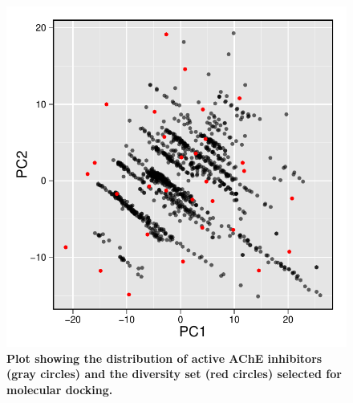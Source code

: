 \documentclass[fleqn,10pt]{wlpeerj}
\begin{document}


\begin{figure}[!t]
\centering
\includegraphics[width = 0.7 \linewidth]{Fig_Kennard_Stone_30}
\caption{\textbf{Plot showing the distribution of active AChE inhibitors (gray circles) and the diversity set (red circles) selected for molecular docking.}} 
\label{fig:30compounds}
\end{figure}
\end{document}
